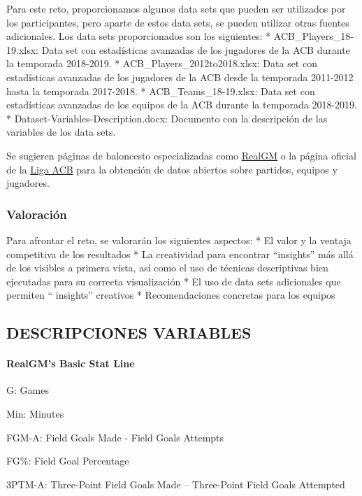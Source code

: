 \documentclass[]{article}
\let\oldparagraph\paragraph
\renewcommand{\paragraph}[1]{\oldparagraph{#1}\mbox{}}
\begin{document}
Para este reto, proporcionamos algunos data sets que pueden ser
utilizados por los participantes, pero aparte de estos data sets, se
pueden utilizar otras fuentes adicionales. Los data sets proporcionados
son los siguientes: * ACB\_Players\_18-19.xlsx: Data set con
estadísticas avanzadas de los jugadores de la ACB durante la temporada
2018-2019. * ACB\_Players\_2012to2018.xlsx: Data set con estadísticas
avanzadas de los jugadores de la ACB desde la temporada 2011-2012 hasta
la temporada 2017-2018. * ACB\_Teams\_18-19.xlsx: Data set con
estadísticas avanzadas de los equipos de la ACB durante la temporada
2018-2019. * Dataset-Variables-Description.docx: Documento con la
descripción de las variables de los data sets.

Se sugieren páginas de baloncesto especializadas como
\href{https://basketball.realgm.com/}{RealGM} o la página oficial de la
\href{http://www.acb.com/}{Liga ACB} para la obtención de datos abiertos
sobre partidos, equipos y jugadores.

\subsubsection{Valoración}\label{valoracion}

Para afrontar el reto, se valorarán los siguientes aspectos: * El valor
y la ventaja competitiva de los resultados * La creatividad para
encontrar ``insights'' más allá de los visibles a primera vista, así
como el uso de técnicas descriptivas bien ejecutadas para su correcta
visualización * El uso de data sets adicionales que permiten ``
insights'' creativos * Recomendaciones concretas para los equipos

\subsection{DESCRIPCIONES VARIABLES}\label{descripciones-variables}

\paragraph{RealGM's Basic Stat Line}\label{realgms-basic-stat-line}

G: Games

Min: Minutes

FGM-A: Field Goals Made - Field Goals Attempts

FG\%: Field Goal Percentage

3PTM-A: Three-Point Field Goals Made -- Three-Point Field Goals
Attempted
\end{document}
